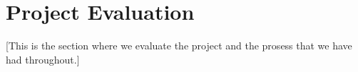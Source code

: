 \section{Project Evaluation}\label{Project Evaluation}
    [This is the section where we evaluate the project and the prosess that we have had throughout.]
